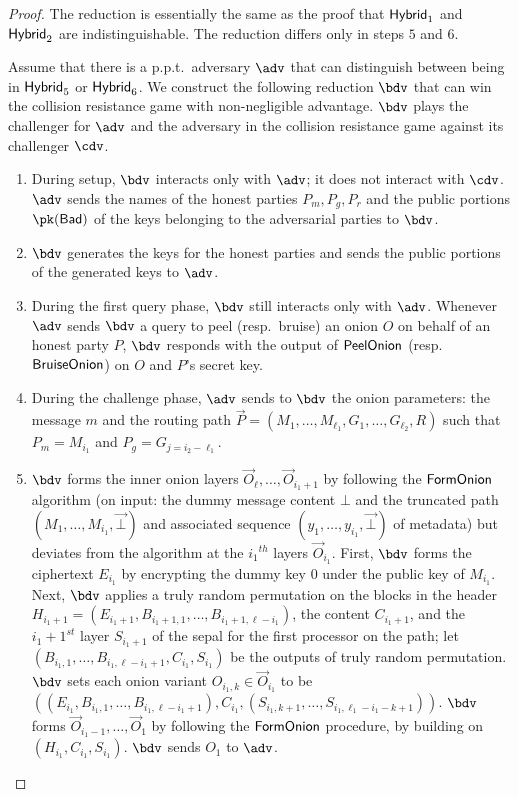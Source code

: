 \documentclass[runningheads,a4paper]{llncs}
\begin{document}
\begin{proof}
The reduction is essentially the same as the proof that $\mathsf{Hybrid}_{1}$ and $\mathsf{Hybrid}_{2}$ are indistinguishable. The reduction differs only in steps $5$ and $6$.  

Assume that there is a p.p.t.~adversary $\adv$ that can distinguish between being in $\mathsf{Hybrid}_{5}$ or $\mathsf{Hybrid}_{6}$. 
We construct the following reduction $\bdv$ that can win the collision resistance game with non-negligible advantage. $\bdv$ plays the challenger for $\adv$ and the adversary in the collision resistance game against its challenger $\cdv$. 

\begin{enumerate}
\item During setup, $\bdv$ interacts only with $\adv$; it does not interact with $\cdv$. $\adv$ sends the names of the honest parties $P_m, P_g, P_r$ and the public portions $\pk(\Bad)$ of the keys  belonging to the adversarial parties to $\bdv$. 

\item $\bdv$ generates the keys for the honest parties and sends the public portions of the generated keys to $\adv$. 

\item During the first query phase, $\bdv$ still interacts only with $\adv$. Whenever $\adv$ sends $\bdv$ a query to peel (resp.~bruise) an onion $O$ on behalf of an honest party $P$, $\bdv$ responds with the output of $\mathsf{PeelOnion}$ (resp.~$\mathsf{BruiseOnion}$) on $O$ and $P$'s secret key. 

\item During the challenge phase, $\adv$ sends to $\bdv$ the onion parameters: the message $m$ and the routing path $\vec{P} = (M_1, \dots, M_{\ell_1}, G_1, \dots, G_{\ell_2}, R)$ such that $P_m = M_{i_1}$ and $P_g = G_{j=i_2-\ell_1}$. 

\item $\bdv$ forms the inner onion layers $\vec{O}_\ell, \dots, \vec{O}_{i_1+1}$ by following the $\mathsf{FormOnion}$ algorithm (on input: the dummy message content $\bot$ and the truncated path $(M_1, \dots, M_{i_1}, \vec{\bot})$ and associated sequence $(y_1, \dots, y_{i_1}, \vec{\bot})$ of metadata) but deviates from the algorithm at the ${i_1}^\mathit{th}$ layers $\vec{O}_{i_1}$.  
First, $\bdv$ forms the ciphertext $E_{i_1}$ by encrypting the dummy key $0$ under the public key of $M_{i_1}$. 
Next, $\bdv$ applies a truly random permutation on the blocks in the header $H_{i_1+1} = (E_{i_1+1}, B_{i_1+1,1}, \dots, B_{i_1+1, \ell-i_1})$, the content $C_{i_1+1}$, and the $i_1+1^\mathit{st}$ layer $S_{i_1+1}$ of the sepal for the first processor on the path; let $(B_{i_1, 1}, \dots, B_{i_1, \ell-i_1+1}, C_{i_1}, S_{i_1})$ be the outputs of truly random permutation. $\bdv$ sets each onion variant $O_{i_1, k} \in \vec{O}_{i_1}$ to be $((E_{i_1}, B_{i_1, 1}, \dots, B_{i_1, \ell-i_1+1}), C_{i_1}, (S_{i_1, k+1}, \dots, S_{i_1, \ell_1-i_1-k+1}))$. $\bdv$ forms $\vec{O}_{i_1-1}, \dots, \vec{O}_1$ by following the $\mathsf{FormOnion}$ procedure, by building on $(H_{i_1}, C_{i_1}, S_{i_1})$. $\bdv$ sends $O_1$ to $\adv$.  


\end{enumerate}
\end{proof}
\end{document}

